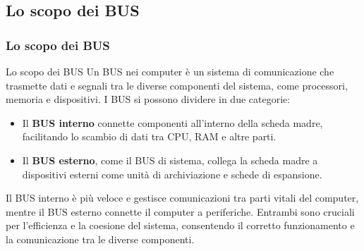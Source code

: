 \subsection[Lo scopo dei BUS]{Lo scopo dei BUS}
\begin{frame}
	\frametitle{Lo scopo dei BUS}
	
	\begin{block}{Lo scopo dei BUS}
		Un BUS nei computer è un sistema di comunicazione che trasmette dati e segnali tra le diverse componenti del sistema, come processori, memoria e dispositivi. I BUS si possono dividere in due categorie:
		\begin{itemize}
			\item Il \textbf{BUS interno} connette componenti all'interno della scheda madre, facilitando lo scambio di dati tra CPU, RAM e altre parti.
			\item Il \textbf{BUS esterno}, come il BUS di sistema, collega la scheda madre a dispositivi esterni come unità di archiviazione e schede di espansione. 
		\end{itemize}
		
		Il BUS interno è più veloce e gestisce comunicazioni tra parti vitali del computer, mentre il BUS esterno connette il computer a periferiche. Entrambi sono cruciali per l'efficienza e la coesione del sistema, consentendo il corretto funzionamento e la comunicazione tra le diverse componenti.
		
	\end{block}
	
\end{frame}
